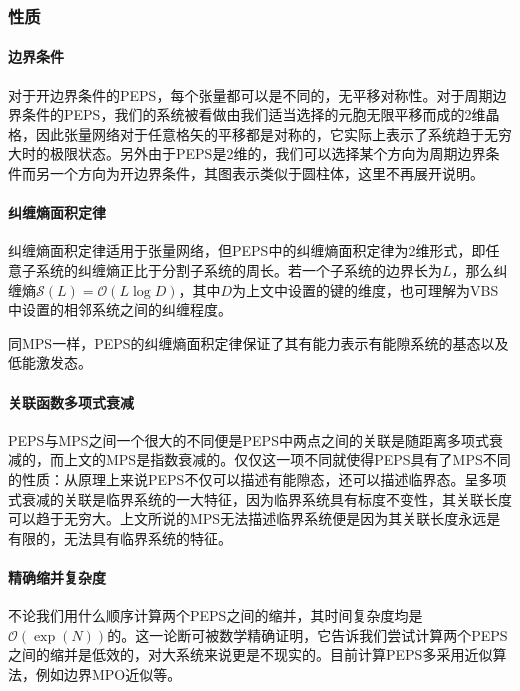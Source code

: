 \subsubsection{性质}

\paragraph{边界条件}

对于开边界条件的PEPS，每个张量都可以是不同的，无平移对称性。对于周期边界条件的PEPS，我们的系统被看做由我们适当选择的元胞无限平移而成的2维晶格，因此张量网络对于任意格矢的平移都是对称的，它实际上表示了系统趋于无穷大时的极限状态。另外由于PEPS是2维的，我们可以选择某个方向为周期边界条件而另一个方向为开边界条件\cite[3]{osorioireguiInfiniteMatrixProduct2017}，其图表示类似于圆柱体，这里不再展开说明。

\paragraph{纠缠熵面积定律}

纠缠熵面积定律适用于张量网络，但PEPS中的纠缠熵面积定律为2维形式，即任意子系统的纠缠熵正比于分割子系统的周长。若一个子系统的边界长为$L$，那么纠缠熵$\mathcal{S}(L)=\mathcal{O}(L\log\!D)$，其中$D$为上文中设置的键的维度，也可理解为VBS中设置的相邻系统之间的纠缠程度。

同MPS一样，PEPS的纠缠熵面积定律保证了其有能力表示有能隙系统的基态以及低能激发态。

\paragraph{关联函数多项式衰减}

PEPS与MPS之间一个很大的不同便是PEPS中两点之间的关联是随距离多项式衰减的，而上文的MPS是指数衰减的。仅仅这一项不同就使得PEPS具有了MPS不同的性质：从原理上来说PEPS不仅可以描述有能隙态，还可以描述临界态。呈多项式衰减的关联是临界系统的一大特征，因为临界系统具有标度不变性，其关联长度可以趋于无穷大\cite[138]{PracticalIntroductionTensor2014}。上文所说的MPS无法描述临界系统便是因为其关联长度永远是有限的，无法具有临界系统的特征。

\paragraph{精确缩并复杂度}

不论我们用什么顺序计算两个PEPS之间的缩并，其时间复杂度均是$\mathcal{O}\left(\exp(N)\right)$的\cite[139]{PracticalIntroductionTensor2014}。这一论断可被数学精确证明，它告诉我们尝试计算两个PEPS之间的缩并是低效的，对大系统来说更是不现实的。目前计算PEPS多采用近似算法，例如边界MPO近似\cite{lubaschUnifyingProjectedEntangled2014}等。

